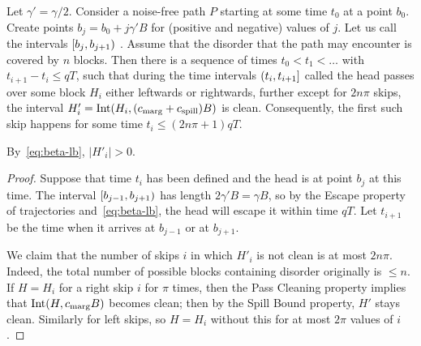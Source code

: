 \documentclass[11pt]{memoir}
\theoremstyle{definition} %
\renewcommand{\le}{\leq}
\def\B{B}
\newcommand{\escno}{q}
\newcommand{\Int}{\mathrm{Int}} %
\newcommand{\passno}{\pi}
\newcommand{\Tu}{T}
\newcommand{\cns}[1]{c_{\textrm{\upshape #1}}}
\newcommand{\CMarg}{\cns{marg}}
\newcommand{\CSpill}{\cns{spill}}
\begin{document}
\begin{lemma}\label{lem:create-holes}
 Let \( \gamma' = \gamma/2 \).
 Consider a noise-free path \( P \) starting at some time \( t_{0} \) at a point \( b_{0} \).
Create points \( b_{j}=b_{0}+j\gamma'\B \) for (positive and negative) values of \( j \).
Let us call the intervals \( \left[b_{j},b_{j+1}\right) \) .
Assume that the disorder that the path may encounter is covered by \( n \) blocks.
Then there is a sequence of times \( t_{0}<t_{1}<\dots \) 
with \( t_{i+1}-t_{i}\le\escno\Tu \), such that during the time 
intervals \( (t_{i},t_{i+1}] \) called  the head passes over some block \( H_{i} \)
either leftwards or rightwards, further
except for \( 2 n\passno \) skips, the interval
\( H'_{i}=\Int(H_{i},(\CMarg+\CSpill)\B) \) is clean.
Consequently, the first such skip happens for some 
time \( t_{i}\le (2 n\passno + 1)\escno\Tu \).
\end{lemma}
By~\eqref{eq:beta-lb}, \( |H'_{i}|>0 \).
\begin{proof}
  Suppose that time \( t_{i} \) has been defined and the head is at point \( b_{j} \) at this time.
  The interval \( \left[b_{j-1},b_{j+1}\right) \) has length \( 2\gamma'\B=\gamma\B \), so 
  by the Escape property of trajectories and~\eqref{eq:beta-lb}, the head
  will escape it within time \( \escno\Tu \).
  Let \( t_{i+1} \) be the time when it arrives at \( b_{j-1} \) or at \( b_{j+1} \).
  
  We claim that the number of skips \( i \) in which \( H'_{i} \)
  is not clean is at most \(  2 n\passno \).
  Indeed, the total number of possible blocks containing disorder originally is \( \le n \).
  If \( H = H_{i} \) for a right skip \( i \) for \( \passno \) times,
  then the Pass Cleaning property implies that \( \Int(H,\CMarg\B) \)
  becomes clean; then by the Spill Bound property, \( H' \)  stays clean.
  Similarly for left skips, so \( H = H_{i} \) without this for at most \( 2\passno \) values of \( i \).
\end{proof}
\end{document}
